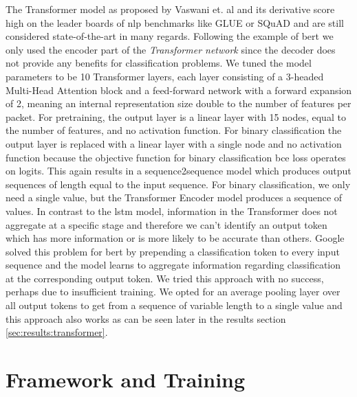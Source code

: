The Transformer model as proposed by Vaswani et. al \cite{attention} and its derivative score high on the leader boards of \gls{nlp} benchmarks like GLUE \cite{glue} or SQuAD \cite{bibid} and are still considered state-of-the-art in many regards. Following the example of \gls{bert} we only used the encoder part of the \textit{Transformer network} since the decoder does not provide any benefits for classification problems. We tuned the model parameters to be 10 Transformer layers, each layer consisting of a 3-headed Multi-Head Attention block and a feed-forward network with a forward expansion of 2, meaning an internal representation size double to the number of features per packet. For pretraining, the output layer is a linear layer with 15 nodes, equal to the number of features, and no activation function. For binary classification the output layer is replaced with a linear layer with a single node and no activation function because the objective function for binary classification \gls{bce} loss operates on logits. This again results in a sequence2sequence model which produces output sequences of length equal to the input sequence. For binary classification, we only need a single value, but the Transformer Encoder model produces a sequence of values. In contrast to the \gls{lstm} model, information in the Transformer does not aggregate at a specific stage and therefore we can't identify an output token which has more information or is more likely to be accurate than others. Google solved this problem for \gls{bert} by prepending a classification token to every input sequence and the model learns to aggregate information regarding classification at the corresponding output token. We tried this approach with no success, perhaps due to insufficient training. We opted for an average pooling layer over all output tokens to get from a sequence of variable length to a single value and this approach also works as can be seen later in the results section \ref{sec:results:transformer}.


\section{Framework and Training}

